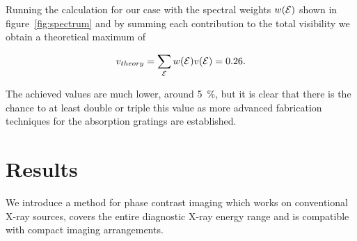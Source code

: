 Running the calculation for our case with the spectral weights $w(\mathcal{E})$ shown in
figure~\ref{fig:spectrum} and by summing each contribution to the total
visibility we obtain a theoretical maximum of

\begin{equation}
    v_{theory} = \sum_{\mathcal{E}} w(\mathcal{E})v(\mathcal{E}) = 0.26.
    \label{eq:maximum.visibility}
\end{equation}

The achieved values are much lower, around \SI{5}{\percent}, but it is clear
that there is the chance to at least double or triple this value as more
advanced fabrication techniques for the absorption gratings are established.

\section{Results}
We introduce a method for phase contrast imaging which works on
conventional X-ray sources, covers the entire diagnostic X-ray energy range
and is compatible with compact imaging arrangements. 

